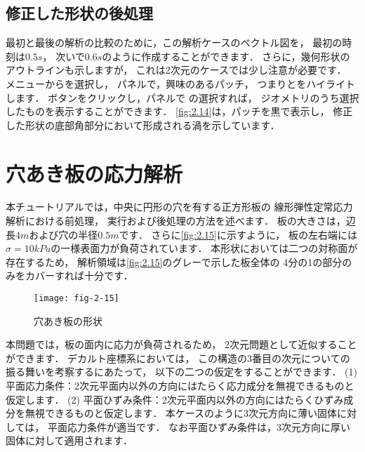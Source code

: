 \subsection{修正した形状の後処理}
\label{ssec:2.1.10}
最初と最後の解析の比較のために，この解析ケースのベクトル図を，
最初の時刻は$0.5\unit{s}$，
次いで$0.6\unit{s}$のように作成することができます．
さらに，幾何形状のアウトラインも示しますが，
これは2次元のケースでは少し注意が必要です．
メニューからを選択し，
パネルで，興味のあるパッチ，
つまりとをハイライトします．
ボタンをクリックし，パネルで
の選択すれば，
ジオメトリのうち選択したものを表示することができます．
\autoref{fig:2.14}は，パッチを黒で表示し，
修正した形状の底部角部分において形成される渦を示しています．



\section{穴あき板の応力解析}
\label{sec:2.2}
%
%
本チュートリアルでは，中央に円形の穴を有する正方形板の
線形弾性定常応力解析における前処理，
実行および後処理の方法を述べます．
板の大きさは，辺長$4\unit{m}$および穴の半径$0.5\unit{m}$です．
さらに\autoref{fig:2.15}に示すように，
板の左右端には$\sigma = 10\unit{kPa}$の一様表面力が負荷されています．
本形状においては二つの対称面が存在するため，
解析領域は\autoref{fig:2.15}のグレーで示した板全体の
4分の1の部分のみをカバーすれば十分です．


\begin{figure}[ht]
 \texttt{[image: fig-2-15]}
 \caption{穴あき板の形状}
 \label{fig:2.15}
\end{figure}


本問題では，板の面内に応力が負荷されるため，
2次元問題として近似することができます．
デカルト座標系においては，
この構造の3番目の次元についての振る舞いを考察するにあたって，
以下の二つの仮定をすることができます．
(1) 平面応力条件：2次元平面内以外の方向にはたらく応力成分を無視できるものと仮定します．
(2) 平面ひずみ条件：2次元平面内以外の方向にはたらくひずみ成分を無視できるものと仮定します．
本ケースのように3次元方向に薄い固体に対しては，
平面応力条件が適当です．
なお平面ひずみ条件は，3次元方向に厚い固体に対して適用されます．

